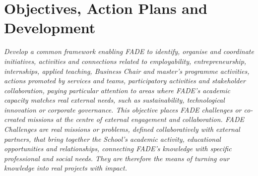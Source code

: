 \documentclass[11pt,a4paper]{scrreprt}
\begin{document}
\section{Objectives, Action Plans and Development}
{\small\color{mutedcolor}\itshape Develop a common framework enabling FADE to identify, organise and coordinate initiatives, activities and connections related to employability, entrepreneurship, internships, applied teaching, Business Chair and master's programme activities, actions promoted by services and teams, participatory activities and stakeholder collaboration, paying particular attention to areas where FADE's academic capacity matches real external needs, such as sustainability, technological innovation or corporate governance. This objective places FADE challenges or co-created missions at the centre of external engagement and collaboration. FADE Challenges are real missions or problems, defined collaboratively with external partners, that bring together the School's academic activity, educational opportunities and relationships, connecting FADE's knowledge with specific professional and social needs. They are therefore the means of turning our knowledge into real projects with impact. }\par\vspace{6pt}
\end{document}

